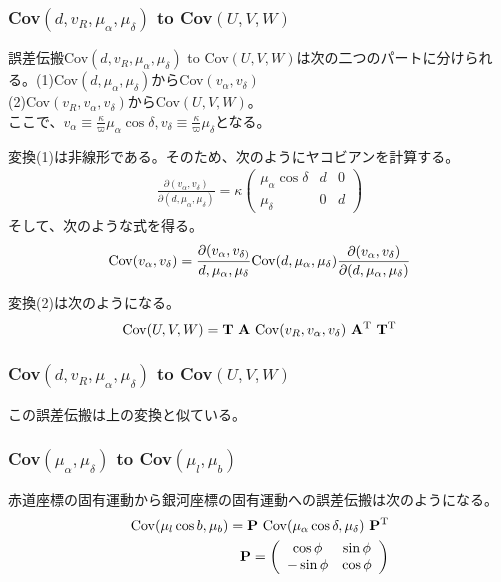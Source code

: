 \subsubsection{Cov$(d,v_R,\mu_{\alpha},\mu_{\delta})$ to Cov$(U,V,W)$}
誤差伝搬Cov$(d,v_R,\mu_{\alpha},\mu_{\delta})$ to Cov$(U,V,W)$は次の二つのパートに分けられる。(1)Cov$(d,\mu_{\alpha},\mu_{\delta})$からCov$(v_{\alpha},v_{\delta})$\\
(2)Cov$(v_R,v_{\alpha},v_{\delta})$からCov$(U,V,W)$。\\
ここで、$v_{\alpha} \equiv \frac{\kappa}{\varpi} \mu_{\alpha} \cos \delta, v_{\delta} \equiv \frac{\kappa}{\varpi}\mu_{\delta}$となる。

変換(1)は非線形である。そのため、次のようにヤコビアンを計算する。
\begin{align}
    \frac{\partial(v_{\alpha}, v_{\delta})}{\partial(d,\mu_{\alpha},\mu_{\delta})} = \kappa
    \left(
	\begin{array}{ccc}
	 	\mu_{\alpha} \cos \delta & d & 0 \\
	 	\mu_{\delta} & 0 & d
	\end{array}
	\right)
\end{align}
そして、次のような式を得る。
\begin{align}
    {\rm Cov}(v_{\alpha},v_{\delta}) = \frac{\partial(v_{\alpha},v_{\delta)}}{d,\mu_{\alpha},\mu_{\delta}} {\rm Cov}(d,\mu_{\alpha},\mu_{\delta}) \frac{\partial(v_{\alpha},v_{\delta})}{\partial(d,\mu_{\alpha},\mu_{\delta})}
\end{align}

変換(2)は次のようになる。
\begin{align}
    {\rm Cov}(U,V,W) = \mathbf{T \ A} \ {\rm Cov}(v_R,v_{\alpha},v_{\delta}) \ \mathbf{A^{\rm T} \ T^{\rm T}}
\end{align}

\subsubsection{Cov$(d,v_R,\mu_{\alpha},\mu_{\delta})$ to Cov$(U,V,W)$}
この誤差伝搬は上の変換と似ている。

\subsubsection{Cov$(\mu_{\alpha},\mu_{\delta})$ to Cov$(\mu_l,\mu_b)$}
赤道座標の固有運動から銀河座標の固有運動への誤差伝搬は次のようになる。
\begin{align}
\begin{aligned}
    {\rm Cov}(\mu_l \cos b,\mu_b) = \mathbf{P} \ {\rm Cov}(\mu_{\alpha} \cos{\delta},\mu_{\delta}) \ \mathbf{P^{\rm T}} \\
    \mathbf{P} = 
    \left(
	\begin{array}{cc}
	 	\cos \phi & \sin \phi \\
	 	-\sin \phi & \cos \phi
	\end{array}
	\right)
\end{aligned}
\end{align}


